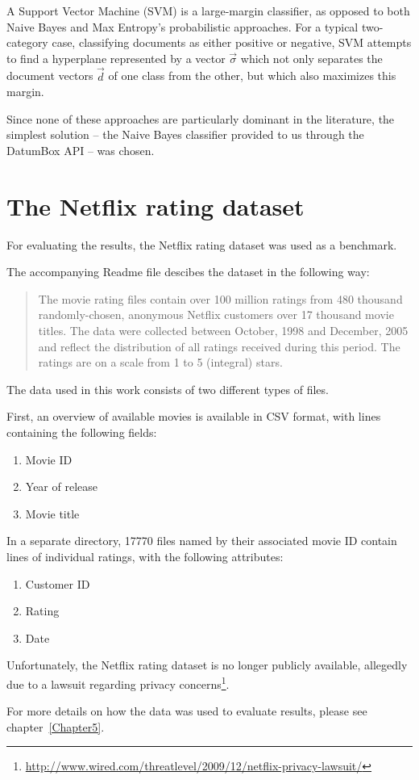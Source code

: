 A Support Vector Machine (SVM) is a large-margin classifier, as opposed to both Naive Bayes and Max Entropy's probabilistic approaches. For a typical two-category case, classifying documents as either positive or negative, SVM attempts to find a hyperplane represented by a vector $\vec{\sigma}$ which not only separates the document vectors $\vec{d}$ of one class from the other, but which also maximizes this margin.

Since none of these approaches are particularly dominant in the literature, the simplest solution -- the Naive Bayes classifier provided to us through the DatumBox API -- was chosen.

\section{The Netflix rating dataset}
\label{sec:netflix_dataset}

For evaluating the results, the Netflix rating dataset was used as a benchmark.

The accompanying Readme file descibes the dataset in the following way:

\begin{quote}
  The movie rating files contain over 100 million ratings from 480 thousand
  randomly-chosen, anonymous Netflix customers over 17 thousand movie titles.  The
  data were collected between October, 1998 and December, 2005 and reflect the
  distribution of all ratings received during this period.  The ratings are on a
  scale from 1 to 5 (integral) stars.
\end{quote}

The data used in this work consists of two different types of files.

First, an overview of available movies is available in CSV format, with lines containing the following fields:

\begin{enumerate}
  \item Movie ID
  \item Year of release
  \item Movie title
\end{enumerate}

In a separate directory, 17770 files named by their associated movie ID contain lines of individual ratings, with the following attributes:

\begin{enumerate}
  \item Customer ID
  \item Rating
  \item Date
\end{enumerate}

Unfortunately, the Netflix rating dataset is no longer publicly available, allegedly due to a lawsuit regarding privacy concerns\footnote{\url{http://www.wired.com/threatlevel/2009/12/netflix-privacy-lawsuit/}}.

For more details on how the data was used to evaluate results, please see chapter~\ref{Chapter5}.
